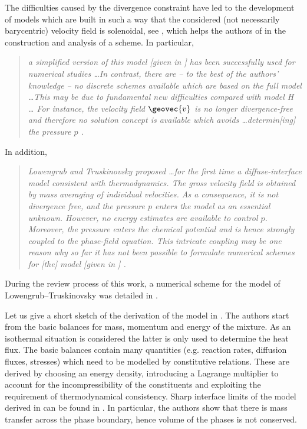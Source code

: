\documentclass[final]{amsart}
\numberwithin{equation}{section}
\begin{document}
The difficulties caused by the divergence constraint have led to the
development of models which are built in such a way that the
considered (not necessarily barycentric) velocity field is solenoidal,
see \cite[e.g.]{AGG,Boy99}, which helps the authors of \cite{Gru,GK}
in the construction and analysis of a scheme.  In particular,
\begin{quote}
  \emph{a simplified version of this model [given in \cite{LT98}] has
    been successfully used for numerical studies \dots In contrast,
    there are -- to the best of the authors' knowledge -- no discrete
    schemes available which are based on the full model \dots This may
    be due to fundamental new difficulties compared with model H \dots
    For instance, the velocity field ${\geovec{v}}$ is no longer
    divergence-free and therefore no solution concept is available
    which avoids \dots determin[ing] the pressure $p$ \cite{AGG}. }
\end{quote}
In addition,
\begin{quote}
  \emph{Lowengrub and Truskinovsky proposed \dots for the first time a
    diffuse-interface model consistent with thermodynamics. The gross
    velocity field is obtained by mass averaging of individual
    velocities. As a consequence, it is not divergence free, and the
    pressure $p$ enters the model as an essential unknown. However, no
    energy estimates are available to control $p$. Moreover, the
    pressure enters the chemical potential and is hence strongly
    coupled to the phase-field equation. This intricate coupling may
    be one reason why so far it has not been possible to formulate
    numerical schemes for [the] model [given in {\cite{LT98}}] \cite{GK}. }
\end{quote}
{During the review process of this work, a numerical scheme for the model of
Lowengrub--Truskinovsky \cite{LT98} was detailed in \cite{LowengrubetChina}.}

Let us give a short sketch of the derivation of the model in
\cite{ADGK}.  The authors start from the basic balances for mass,
momentum and energy of the mixture.  As an isothermal situation is
considered the latter is only used to determine the heat flux.  The
basic balances contain many quantities (e.g. reaction rates, diffusion
fluxes, stresses) which need to be modelled by constitutive relations.
These are derived by choosing an energy density, introducing a
Lagrange multiplier to account for the incompressibility of the
constituents and exploiting the requirement of thermodynamical
consistency. {Sharp interface limits of the model derived in
  \cite{ADGK} can be found in \cite{ADGK,pfmi}. In particular, the
  authors show that there is mass transfer across the phase boundary,
  hence volume of the phases is not conserved.}
\end{document}
